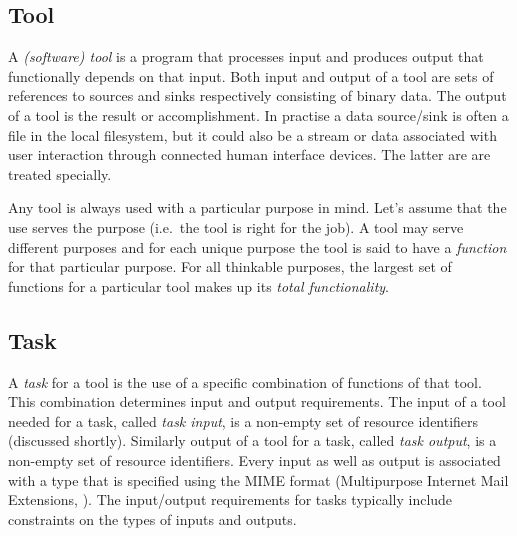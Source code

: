 \documentclass{article}
\begin{document}
  \subsection{Tool}

   A \textit{(software) tool} is a program that processes input and produces
   output that functionally depends on that input. Both input and output of a
   tool are sets of references to sources and sinks respectively consisting of
   binary data.  The output of a tool is the result or accomplishment. In
   practise a data source/sink is often a file in the local filesystem, but it
   could also be a stream or data associated with user interaction through
   connected human interface devices. The latter are are treated specially.

   Any tool is always used with a particular purpose in mind. Let's assume that
   the use serves the purpose (i.e.\ the tool is right for the job). A tool may
   serve different purposes and for each unique purpose the tool is said to
   have a \emph{function} for that particular purpose. For all thinkable
   purposes, the largest set of functions for a particular tool makes up its
   \textit{total functionality}.


  \subsection{Task}

   A \textit{task} for a tool is the use of a specific combination of functions
   of that tool. This combination determines input and output requirements. The
   input of a tool needed for a task, called \textit{task input}, is a
   non-empty set of resource identifiers (discussed shortly). Similarly output
   of a tool for a task, called \textit{task output}, is a non-empty set of
   resource identifiers. Every input as well as output is associated with a
   type that is specified using the MIME format (Multipurpose Internet Mail
   Extensions, \cite{rfc2822}). The input/output requirements for tasks
   typically include constraints on the types of inputs and outputs.
\end{document}
